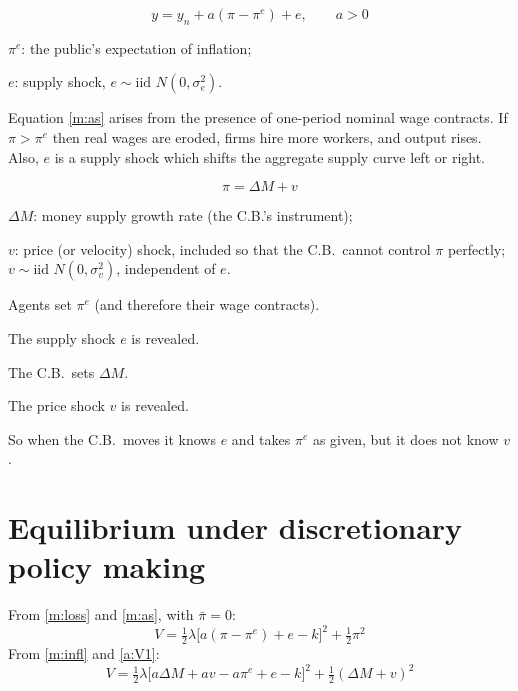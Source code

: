 \documentclass[11pt]{article}
\begin{document}
\begin{equation}
  y=y_n+a(\pi-\pi^e)+e,\qquad a>0 \tag{2}\label{m:as}
\end{equation}
\begin{flatlist}
  \item $\pi^e$: the public's expectation of inflation;
  \item $e$: supply shock, $e\sim\text{iid } N(0,\sigma_e^2)$.
\end{flatlist}
 Equation \eqref{m:as} arises from the presence of one-period nominal
wage contracts. If $\pi>\pi^e$ then real wages are eroded, firms hire more workers, and
output rises. Also, $e$ is a supply shock which shifts the aggregate supply curve left or
right.

\begin{equation}
  \pi=\Delta M+v \tag{3}\label{m:infl}
\end{equation}
\begin{flatlist}
  \item $\Delta M$: money supply growth rate (the C.B.'s instrument);
  \item $v$: price (or velocity) shock, included so that the C.B.\ cannot control $\pi$
        perfectly; $v\sim\text{iid } N(0,\sigma_v^2)$, independent of $e$.
\end{flatlist}

\begin{flatnum}
  \item[(i)] Agents set $\pi^e$ (and therefore their wage contracts).
  \item[(ii)] The supply shock $e$ is revealed.
  \item[(iii)] The C.B.\ sets $\Delta M$.
  \item[(iv)] The price shock $v$ is revealed.
\end{flatnum}
So when the C.B.\ moves it knows $e$ and takes $\pi^e$ as given, but it does not know $v$.


\section{Equilibrium under discretionary policy making}

From \eqref{m:loss} and \eqref{m:as}, with $\bar\pi=0$:
\begin{equation}
  V=\tfrac12\lambda\bigl[a(\pi-\pi^e)+e-k\bigr]^2+\tfrac12\pi^2 \tag{A.4}\label{a:V1}
\end{equation}
From \eqref{m:infl} and \eqref{a:V1}:
\begin{equation}
  V=\tfrac12\lambda\bigl[a\Delta M+av-a\pi^e+e-k\bigr]^2+\tfrac12(\Delta M+v)^2
  \tag{A.5}\label{a:V2}
\end{equation}
\end{document}
